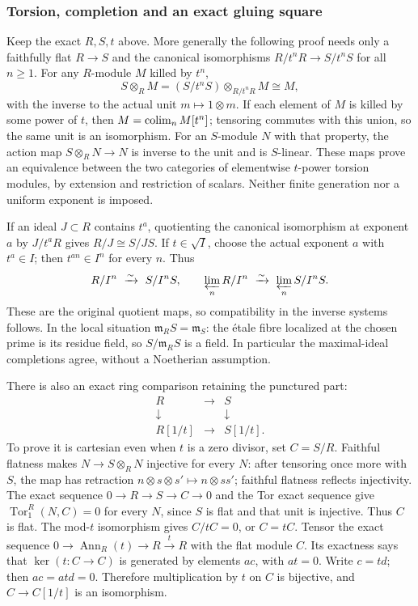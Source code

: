 \subsubsection{Torsion, completion and an exact gluing square}\label{algebra-proof-054-torsion-completion-and-an-exact-gluing-square}

Keep the exact \(R,S,t\) above. More generally the following proof needs only a faithfully flat \(R\to S\) and the canonical isomorphisms \(R/t^nR\to S/t^nS\) for all \(n\geq1\). For any \(R\)-module \(M\) killed by \(t^n\), \[
S\otimes_R M=(S/t^nS)\otimes_{R/t^nR}M\cong M,
\] with the inverse to the actual unit \(m\mapsto1\otimes m\). If each element of \(M\) is killed by some power of \(t\), then \(M=\mathop{\rm colim}_n M[t^n]\); tensoring commutes with this union, so the same unit is an isomorphism. For an \(S\)-module \(N\) with that property, the action map \(S\otimes_R N\to N\) is inverse to the unit and is \(S\)-linear. These maps prove an equivalence between the two categories of elementwise \(t\)-power torsion modules, by extension and restriction of scalars. Neither finite generation nor a uniform exponent is imposed.

If an ideal \(J\subset R\) contains \(t^a\), quotienting the canonical isomorphism at exponent \(a\) by \(J/t^aR\) gives \(R/J\cong S/JS\). If \(t\in\sqrt I\), choose the actual exponent \(a\) with \(t^a\in I\); then \(t^{an}\in I^n\) for every \(n\). Thus \[
R/I^n\ \xrightarrow{\sim}\ S/I^nS,\qquad
\varprojlim_n R/I^n\ \xrightarrow{\sim}\ \varprojlim_n S/I^nS.
\] These are the original quotient maps, so compatibility in the inverse systems follows. In the local situation \(\mathfrak m_RS=\mathfrak m_S\): the étale fibre localized at the chosen prime is its residue field, so \(S/\mathfrak m_RS\) is a field. In particular the maximal-ideal completions agree, without a Noetherian assumption.

There is also an exact ring comparison retaining the punctured part: \[
\begin{matrix}
R&\longrightarrow&S\\
\downarrow&&\downarrow\\
R[1/t]&\longrightarrow&S[1/t].
\end{matrix}
\tag{LI-1}
\] To prove it is cartesian even when \(t\) is a zero divisor, set \(C=S/R\). Faithful flatness makes \(N\to S\otimes_R N\) injective for every \(N\): after tensoring once more with \(S\), the map has retraction \(n\otimes s\otimes s'\mapsto n\otimes ss'\); faithful flatness reflects injectivity. The exact sequence \(0\to R\to S\to C\to0\) and the Tor exact sequence give \(\operatorname{Tor}_1^R(N,C)=0\) for every \(N\), since \(S\) is flat and that unit is injective. Thus \(C\) is flat. The mod-\(t\) isomorphism gives \(C/tC=0\), or \(C=tC\). Tensor the exact sequence \(0\to\operatorname{Ann}_R(t)\to R\xrightarrow{t}R\) with the flat module \(C\). Its exactness says that \(\ker(t:C\to C)\) is generated by elements \(ac\), with \(at=0\). Write \(c=td\); then \(ac=atd=0\). Therefore multiplication by \(t\) on \(C\) is bijective, and \(C\to C[1/t]\) is an isomorphism.

